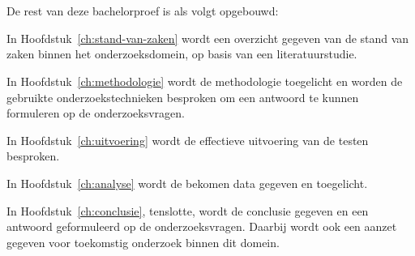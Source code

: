 \pagebreak
\section{}%
\label{sec:opzet-bachelorproef}


De rest van deze bachelorproef is als volgt opgebouwd:

In Hoofdstuk~\ref{ch:stand-van-zaken} wordt een overzicht gegeven van de stand van zaken binnen het onderzoeksdomein, op basis van een literatuurstudie.

In Hoofdstuk~\ref{ch:methodologie} wordt de methodologie toegelicht en worden de gebruikte onderzoekstechnieken besproken om een antwoord te kunnen formuleren op de onderzoeksvragen.


In Hoofdstuk~\ref{ch:uitvoering} wordt de effectieve uitvoering van de testen besproken.

In Hoofdstuk~\ref{ch:analyse} wordt de bekomen data gegeven en toegelicht.

In Hoofdstuk~\ref{ch:conclusie}, tenslotte, wordt de conclusie gegeven en een antwoord geformuleerd op de onderzoeksvragen. Daarbij wordt ook een aanzet gegeven voor toekomstig onderzoek binnen dit domein.
